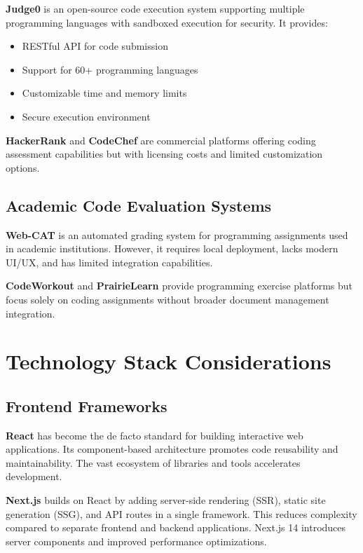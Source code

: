 \textbf{Judge0} is an open-source code execution system supporting multiple programming languages with sandboxed execution for security. It provides:
\begin{itemize}
\item RESTful API for code submission
\item Support for 60+ programming languages
\item Customizable time and memory limits
\item Secure execution environment
\end{itemize}

\textbf{HackerRank} and \textbf{CodeChef} are commercial platforms offering coding assessment capabilities but with licensing costs and limited customization options.

\subsection{Academic Code Evaluation Systems}

\textbf{Web-CAT} is an automated grading system for programming assignments used in academic institutions. However, it requires local deployment, lacks modern UI/UX, and has limited integration capabilities.

\textbf{CodeWorkout} and \textbf{PrairieLearn} provide programming exercise platforms but focus solely on coding assignments without broader document management integration.

\section{Technology Stack Considerations}

\subsection{Frontend Frameworks}

\textbf{React} has become the de facto standard for building interactive web applications. Its component-based architecture promotes code reusability and maintainability. The vast ecosystem of libraries and tools accelerates development.

\textbf{Next.js} builds on React by adding server-side rendering (SSR), static site generation (SSG), and API routes in a single framework. This reduces complexity compared to separate frontend and backend applications. Next.js 14 introduces server components and improved performance optimizations.

